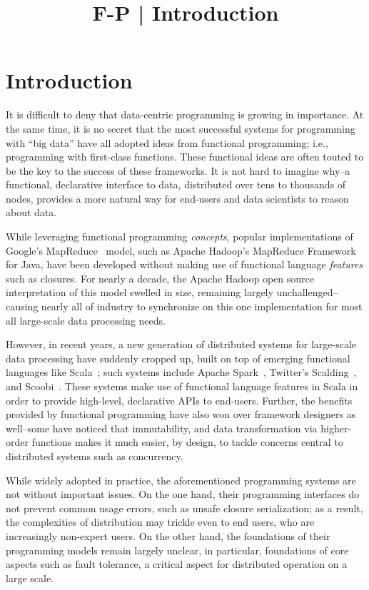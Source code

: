 \documentclass{article}
\title{F-P | Introduction}
\begin{document}
\maketitle

\section{Introduction}

It is difficult to deny that data-centric programming is growing in importance.
At the same time, it is no secret that the most successful systems for
programming with ``big data'' have all adopted ideas from functional
programming; i.e., programming with first-class functions. These functional ideas
are often touted to be the key to the success of these frameworks. It is not
hard to imagine why--a functional, declarative interface to data, distributed
over tens to thousands of nodes, provides a more natural way for end-users and
data scientists to reason about data.

While leveraging functional programming {\em concepts}, popular implementations
of Google's MapReduce~\cite{MapReduce} model, such as Apache Hadoop's
MapReduce Framework~\cite{Hadoop} for Java, have been developed without making use of
functional language {\em features} such as closures. For nearly a decade, the
Apache Hadoop open source interpretation of this model swelled in size,
remaining largely unchallenged--causing nearly all of industry to synchronize on
this one implementation for most all large-scale data processing needs.

However, in recent years, a new generation of distributed systems for
large-scale data processing have suddenly cropped up, built on top of emerging
functional languages like Scala~\cite{ScalaBook}; such systems include Apache
Spark~\cite{Spark}, Twitter's Scalding~\cite{Scalding}, and
Scoobi~\cite{Scoobi}. These systems make use of functional language features in
Scala in order to provide high-level, declarative APIs to end-users. Further,
the benefits provided by functional programming have also won over framework
designers as well--some have noticed that immutability, and data transformation
via higher-order functions makes it much easier, by design, to tackle concerns
central to distributed systems such as concurrency.

While widely adopted in practice, the aforementioned programming systems are not without important issues. On the one hand, their programming interfaces do not prevent common usage errors, such as unsafe closure serialization; as a result, the complexities of distribution may trickle even to end users, who are increasingly non-expert users. On the other hand, the foundations of their programming models remain largely unclear, in particular, foundations of core aspects such as fault tolerance, a critical aspect for distributed operation on a large scale.
\end{document}
